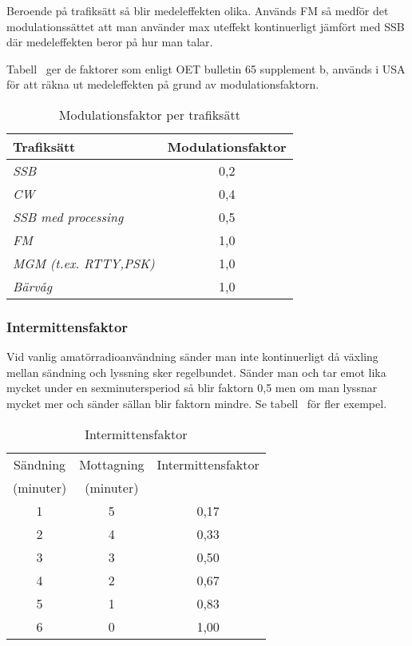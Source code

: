 Beroende på trafiksätt så blir medeleffekten olika.
Används FM så medför det modulationssättet att man använder max uteffekt
kontinuerligt jämfört med SSB där medeleffekten beror på hur man talar.

Tabell~ ger de faktorer som enligt OET bulletin 65 supplement b,
\cite{OETbul65b} används i USA för att räkna ut medeleffekten på grund
av modulationsfaktorn.

\begin{table}[H]
  \begin{center}
    \begin{tabular}{lc}
	\textbf{Trafiksätt} & \textbf{Modulationsfaktor} \\ 
	\hline
	\emph{SSB} & 0,2 \\ 
	\emph{CW} & 0,4 \\ 
	\emph{SSB med processing} & 0,5 \\ 
	\emph{FM} & 1,0 \\ 
	\emph{MGM (t.ex. RTTY,PSK)} & 1,0 \\ 
	\emph{Bärvåg} & 1,0 \\ 
    \end{tabular}
    \caption{Modulationsfaktor per trafiksätt}
    \label{tab:modfakt}
  \end{center}
\end{table}

\subsubsection{Intermittensfaktor}

Vid vanlig amatörradioanvändning sänder man inte kontinuerligt då växling
mellan sändning och lyssning sker regelbundet.
Sänder man och tar emot lika mycket under en sexminutersperiod så blir faktorn
0,5 men om man lyssnar mycket mer och sänder sällan blir faktorn mindre.
Se tabell~ för fler exempel.

\begin{table}[H]
  \begin{center}
    \begin{tabular}{|c|c|c|}
	\hline
	Sändning  & Mottagning & Intermittensfaktor \\
	(minuter) & (minuter)  & \\ \hline
	1 & 5 & 0,17 \\ \hline
	2 & 4 & 0,33 \\ \hline
	3 & 3 & 0,50 \\ \hline
	4 & 2 & 0,67 \\ \hline
	5 & 1 & 0,83 \\ \hline
	6 & 0 & 1,00 \\ \hline
    \end{tabular}
    \caption{Intermittensfaktor}
    \label{tab:intfakt}
  \end{center}
\end{table}

